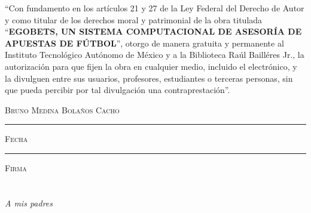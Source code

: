 
\thispagestyle{empty}
\vspace*{\fill}
\begingroup
``Con fundamento en los artículos 21 y 27 de la Ley Federal del Derecho de Autor y como titular de los derechos moral y patrimonial de la obra titulada ``\textbf{EGOBETS, UN SISTEMA COMPUTACIONAL DE ASESORÍA DE APUESTAS DE FÚTBOL}'', otorgo de manera gratuita y permanente al Instituto Tecnológico Autónomo de México y a la Biblioteca Raúl Bailléres Jr., la autorización para que fijen la obra en cualquier medio, incluido el electrónico, y la divulguen entre sus usuarios, profesores, estudiantes o terceras personas, sin que pueda percibir por tal divulgación una contraprestación''.

\centering

\hspace{3em}

\textsc{Bruno Medina Bolaños Cacho}

\vspace{5em}

\rule[1em]{20em}{0.5pt} %

\textsc{Fecha}
 
\vspace{8em}

\rule[1em]{20em}{0.5pt} %

\textsc{Firma}

\endgroup
\vspace*{\fill}


\thispagestyle{empty}
\frontmatter

\chapter*{}
\begin{flushright}
\textit{A mis padres}
\end{flushright}



